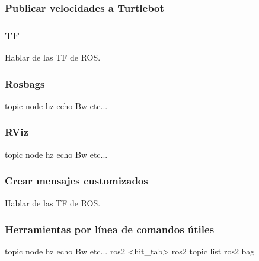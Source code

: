 \begin{frame}
	\frametitle{Publicar velocidades a Turtlebot}
	
\end{frame}

\begin{frame}
	\frametitle{TF}
	Hablar de las TF de ROS.
	
\end{frame}

\begin{frame}
	\frametitle{Rosbags}
	topic node hz echo Bw etc...
	
\end{frame}

\begin{frame}
	\frametitle{RViz}
	topic node hz echo Bw etc...
	
\end{frame}

\begin{frame}
	\frametitle{Crear mensajes customizados}
	Hablar de las TF de ROS.
	
\end{frame}

\begin{frame}
	\frametitle{Herramientas por línea de comandos útiles}
    topic node hz echo Bw etc...
    ros2 <hit\_tab>
    ros2 topic list
    ros2 bag 
	
\end{frame}
